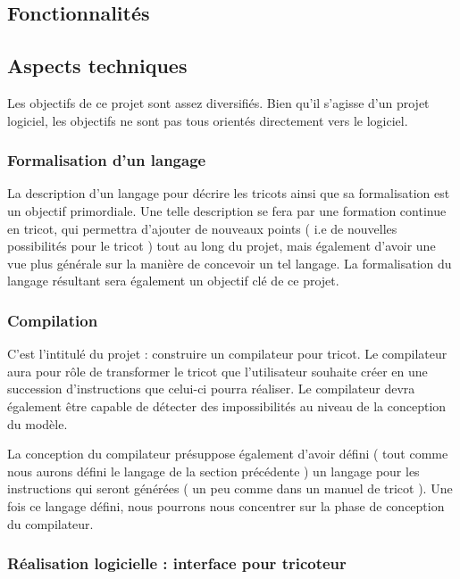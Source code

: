 \documentclass{article}
\begin{document}
\subsection{Fonctionnalités}

\subsection{Aspects techniques}

Les objectifs de ce projet sont assez diversifiés. 
Bien qu'il s'agisse d'un projet logiciel, les objectifs ne sont pas tous orientés directement vers le logiciel.

\subsubsection{Formalisation d'un langage}

La description d'un langage pour décrire les tricots ainsi que sa formalisation est un objectif primordiale.
Une telle description se fera par une formation continue en tricot, qui permettra d'ajouter de nouveaux points ( i.e de nouvelles
possibilités pour le tricot ) tout au long du projet, mais également d'avoir une vue plus générale sur la manière de concevoir un tel
langage. La formalisation du langage résultant sera également un objectif clé de ce projet.

\subsubsection{Compilation}

C'est l'intitulé du projet : construire un compilateur pour tricot. Le compilateur aura pour rôle de transformer le tricot que 
l'utilisateur souhaite créer en une succession d'instructions que celui-ci pourra réaliser. Le compilateur devra également être capable de 
détecter des impossibilités au niveau de la conception du modèle.

La conception du compilateur présuppose également d'avoir défini ( tout comme nous aurons défini le langage de la section précédente ) un 
langage pour les instructions qui seront générées ( un peu comme dans un manuel de tricot ). 
Une fois ce langage défini, nous pourrons nous concentrer sur la phase de conception du compilateur. 

\subsubsection{Réalisation logicielle : interface pour tricoteur}
\end{document}
